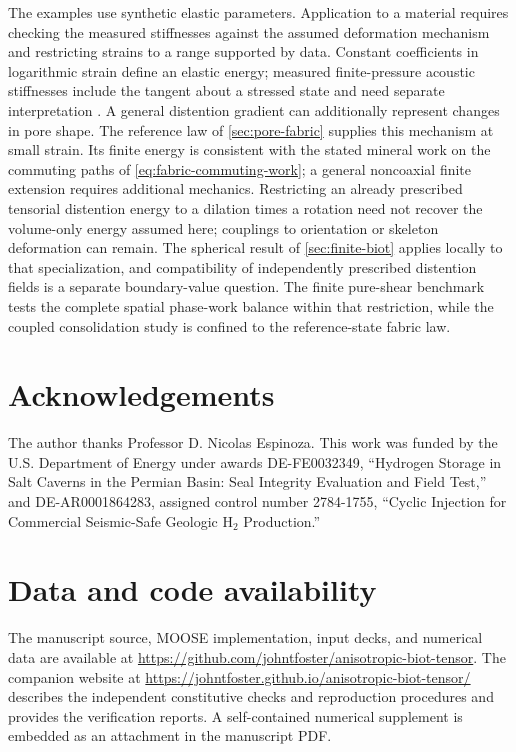 \documentclass[11pt]{article}
\begin{document}
The examples use synthetic elastic parameters. Application to a material
requires checking the measured stiffnesses against the assumed deformation
mechanism and restricting strains to a range supported by data. Constant
coefficients in logarithmic strain define an elastic energy; measured
finite-pressure acoustic stiffnesses include the tangent about a stressed
state and need separate interpretation \citep{zha1996forsterite}.
A general distention gradient can additionally represent changes in pore
shape. The reference law of \cref{sec:pore-fabric} supplies this mechanism
at small strain. Its finite energy is consistent with the stated mineral
work on the commuting paths of \eqref{eq:fabric-commuting-work}; a general
noncoaxial finite extension requires additional mechanics. Restricting an
already prescribed tensorial distention energy to a dilation times a
rotation need not recover the volume-only energy assumed here; couplings
to orientation or skeleton deformation can remain. The spherical result of
\cref{sec:finite-biot} applies locally to that specialization, and
compatibility of independently prescribed distention fields is a separate
boundary-value question. The finite pure-shear benchmark tests the complete spatial phase-work
balance within that restriction, while the coupled consolidation study
is confined to the reference-state fabric law.

\appendix


\section*{Acknowledgements}
The author thanks Professor D. Nicolas Espinoza. This work was funded by the
U.S. Department of Energy under awards DE-FE0032349, ``Hydrogen Storage in Salt
Caverns in the Permian Basin: Seal Integrity Evaluation and Field Test,'' and
DE-AR0001864283, assigned control number 2784-1755, ``Cyclic Injection for
Commercial Seismic-Safe Geologic H$_2$ Production.''

\section*{Data and code availability}

The manuscript source, MOOSE implementation, input decks, and numerical data
are available at \url{https://github.com/johntfoster/anisotropic-biot-tensor}.
The companion website at
\url{https://johntfoster.github.io/anisotropic-biot-tensor/}
describes the independent constitutive checks and reproduction procedures
and provides the verification reports. A self-contained numerical supplement
is embedded as an attachment in the manuscript PDF.
\end{document}
